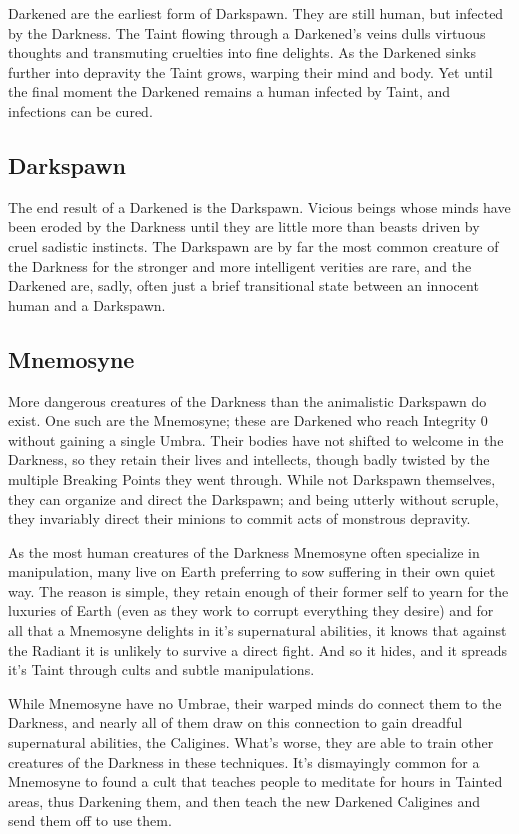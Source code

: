 Darkened are the earliest form of Darkspawn. They are still human, but infected by the Darkness. The Taint flowing through a Darkened's veins dulls virtuous thoughts and transmuting cruelties into fine delights. As the Darkened sinks further into depravity the Taint grows, warping their mind and body. Yet until the final moment the Darkened remains a human infected by Taint, and infections can be cured. 

\subsection*{Darkspawn}

The end result of a Darkened is the Darkspawn. Vicious beings whose minds have been eroded by the Darkness until they are little more than beasts driven by cruel sadistic instincts. The Darkspawn are by far the most common creature of the Darkness for the stronger and more intelligent verities are rare, and the Darkened are, sadly, often just a brief transitional state between an innocent human and a Darkspawn. 

\subsection*{Mnemosyne}
More dangerous creatures of the Darkness than the animalistic Darkspawn do exist. One such are the Mnemosyne; these are Darkened who reach Integrity 0 without gaining a single Umbra. Their bodies have not shifted to welcome in the Darkness, so they retain their lives and intellects, though badly twisted by the multiple Breaking Points they went through. While not Darkspawn themselves, they can organize and direct the Darkspawn; and being utterly without scruple, they invariably direct their minions to commit acts of monstrous depravity.

As the most human creatures of the Darkness Mnemosyne often specialize in manipulation, many live on Earth preferring to sow suffering in their own quiet way. The reason is simple, they retain enough of their former self to yearn for the luxuries of Earth (even as they work to corrupt everything they desire) and for all that a Mnemosyne delights in it's supernatural abilities, it knows that against the Radiant it is unlikely to survive a direct fight. And so it hides, and it spreads it's Taint through cults and subtle manipulations.

While Mnemosyne have no Umbrae, their warped minds do connect them to the Darkness, and nearly all of them draw on this connection to gain dreadful supernatural abilities, the Caligines. What's worse, they are able to train other creatures of the Darkness in these techniques. It's dismayingly common for a Mnemosyne to found a cult that teaches people to meditate for hours in Tainted areas, thus Darkening them, and then teach the new Darkened Caligines and send them off to use them. 

